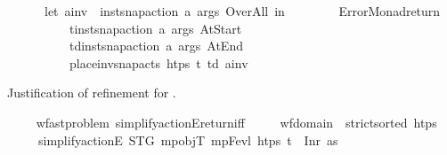 \begin{isabellebody}
\ \ \ \ \ \ let\ a\isactrlsub i\isactrlsub n\isactrlsub v\ {\isacharequal}{\kern0pt}\ inst{\isacharunderscore}{\kern0pt}snap{\isacharunderscore}{\kern0pt}action\ a\ args\ Over{\isacharunderscore}{\kern0pt}All\ in\isanewline
\ \ \ \ \ \ \ \ Error{\isacharunderscore}{\kern0pt}Monad{\isachardot}{\kern0pt}return\ {\isacharparenleft}{\kern0pt}\isanewline
\ \ \ \ \ \ \ \ \ \ {\isacharparenleft}{\kern0pt}t\isactrlsub {\isasympi}{\isacharcomma}{\kern0pt}inst{\isacharunderscore}{\kern0pt}snap{\isacharunderscore}{\kern0pt}action\ a\ args\ At{\isacharunderscore}{\kern0pt}Start{\isacharparenright}{\kern0pt}\ {\isacharhash}{\kern0pt}\ \isanewline
\ \ \ \ \ \ \ \ \ \ {\isacharparenleft}{\kern0pt}t\isactrlsub {\isasympi}{\isacharplus}{\kern0pt}d{\isacharcomma}{\kern0pt}inst{\isacharunderscore}{\kern0pt}snap{\isacharunderscore}{\kern0pt}action\ a\ args\ At{\isacharunderscore}{\kern0pt}End{\isacharparenright}{\kern0pt}\ {\isacharhash}{\kern0pt}\ \isanewline
\ \ \ \ \ \ \ \ \ \ {\isacharparenleft}{\kern0pt}place{\isacharunderscore}{\kern0pt}inv{\isacharunderscore}{\kern0pt}snap{\isacharunderscore}{\kern0pt}acts\ htps\ t\isactrlsub {\isasympi}\ {\isacharparenleft}{\kern0pt}t\isactrlsub {\isasympi}{\isacharplus}{\kern0pt}d{\isacharparenright}{\kern0pt}\ a\isactrlsub i\isactrlsub n\isactrlsub v{\isacharparenright}{\kern0pt}\isanewline
\ \ \ \ \ \ \ \ {\isacharparenright}{\kern0pt}\isanewline
\ \ \ \ {\isacharbraceright}{\kern0pt}{\isachardoublequoteclose}%
\begin{isamarkuptext}%
Justification of refinement for .%
\end{isamarkuptext}\isamarkuptrue%
\ \ \isamarkupfalse%
\ {\isacharparenleft}{\kern0pt}\ wf{\isacharunderscore}{\kern0pt}ast{\isacharunderscore}{\kern0pt}problem{\isacharparenright}{\kern0pt}\ simplify{\isacharunderscore}{\kern0pt}actionE{\isacharunderscore}{\kern0pt}return{\isacharunderscore}{\kern0pt}iff{\isacharcolon}{\kern0pt}\isanewline
\ \ \ \ \ {\isachardoublequoteopen}wf{\isacharunderscore}{\kern0pt}domain{\isachardoublequoteclose}\ \ {\isachardoublequoteopen}strict{\isacharunderscore}{\kern0pt}sorted\ htps{\isachardoublequoteclose}\isanewline
\ \ \ \ \ {\isachardoublequoteopen}simplify{\isacharunderscore}{\kern0pt}actionE\ STG\ mp{\isacharunderscore}{\kern0pt}objT\ mp{\isacharunderscore}{\kern0pt}Fevl\ htps\ {\isacharparenleft}{\kern0pt}t\isactrlsub {\isasympi}{\isacharcomma}{\kern0pt}{\isasympi}{\isacharparenright}{\kern0pt}\ {\isacharequal}{\kern0pt}\ Inr\ as\ \isanewline

\end{isabellebody}
